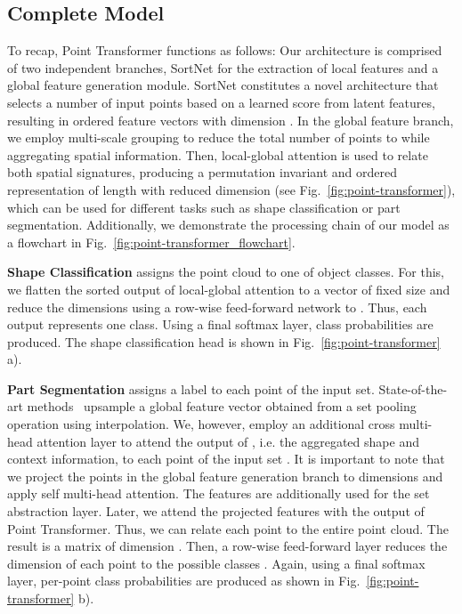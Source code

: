 \documentclass{ieeeaccess}
\begin{document}
\subsection{Complete Model}
To recap, Point Transformer functions as follows: Our architecture is comprised of two independent branches, SortNet for the extraction of local features and a global feature generation module. SortNet constitutes a novel architecture that selects a number of input points based on a learned score from latent features, resulting in  ordered feature vectors with dimension . In the global feature branch, we employ multi-scale grouping to reduce the total number of points to  while aggregating spatial information. Then, local-global attention is used to relate both spatial signatures, producing a permutation invariant and ordered representation of length  with reduced dimension  (see Fig.~\ref{fig:point-transformer}), which can be used for different tasks such as shape classification or part segmentation. Additionally, we demonstrate the processing chain of our model as a flowchart in Fig.~\ref{fig:point-transformer_flowchart}.

\textbf{Shape Classification} assigns the point cloud to one of  object classes. For this, we flatten the sorted output of local-global attention to a vector of fixed size  and reduce the dimensions using a row-wise feed-forward network to . Thus, each output represents one class. Using a final softmax layer, class probabilities are produced. The shape classification head is shown in Fig.~\ref{fig:point-transformer} a). 

\textbf{Part Segmentation} assigns a label to each point of the input set. State-of-the-art methods~\cite{qi2017pointnet++,liu2019point2sequence} upsample a global feature vector obtained from a set pooling operation using interpolation. We, however, employ an additional cross multi-head attention layer to attend the output of , i.e. the aggregated shape and context information, to each point of the input set . 
It is important to note that we project the points in the global feature generation branch to  dimensions and apply self multi-head attention. The features are additionally used for the set abstraction layer. Later, we attend the projected features with the output of Point Transformer. Thus, we can relate each point to the entire point cloud.
The result is a matrix of dimension . Then, a row-wise feed-forward layer reduces the dimension of each point to the  possible classes . Again, using a final softmax layer, per-point class probabilities are produced as shown in Fig.~\ref{fig:point-transformer} b). 
\end{document}
